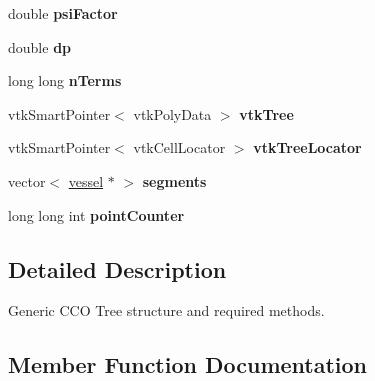 \begin{DoxyCompactItemize}
\item 
\mbox{\label{class_abstract_c_c_o_tree_a269959368c260e2eef64451c6c5b0d44}} 
double {\bfseries psi\+Factor}
\item 
\mbox{\label{class_abstract_c_c_o_tree_a1e964650453c84fe5c7144d6c92b24c8}} 
double {\bfseries dp}
\item 
\mbox{\label{class_abstract_c_c_o_tree_a95c98de7ca3afd50e03407cd4b20e1bf}} 
long long {\bfseries n\+Terms}
\item 
\mbox{\label{class_abstract_c_c_o_tree_af3d641bd0dc18e6d5a1cf09a2e6b6e67}} 
vtk\+Smart\+Pointer$<$ vtk\+Poly\+Data $>$ {\bfseries vtk\+Tree}
\item 
\mbox{\label{class_abstract_c_c_o_tree_a6d80c8e0e4816407ed734cc6e2ae0f5e}} 
vtk\+Smart\+Pointer$<$ vtk\+Cell\+Locator $>$ {\bfseries vtk\+Tree\+Locator}
\item 
\mbox{\label{class_abstract_c_c_o_tree_aad48e46e1e55364fdf46c15060e2575f}} 
vector$<$ \mbox{\hyperlink{structvessel}{vessel}} $\ast$ $>$ {\bfseries segments}
\item 
\mbox{\label{class_abstract_c_c_o_tree_aa34845954c9058f0d4c1c4b32856a14e}} 
long long int {\bfseries point\+Counter}
\end{DoxyCompactItemize}


\subsection{Detailed Description}
Generic C\+CO Tree structure and required methods. 

\subsection{Member Function Documentation}
\mbox{\label{class_abstract_c_c_o_tree_ab16ad7522a75add6d9e44bbab0c70bf3}} 
